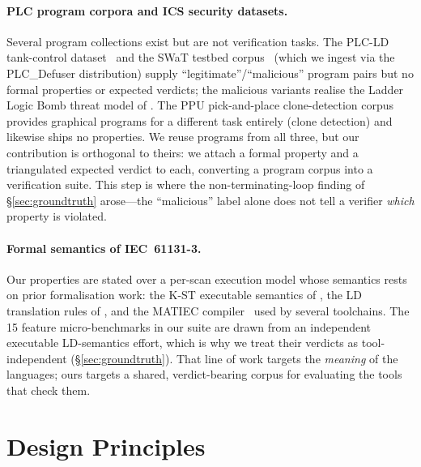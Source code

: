 \paragraph{PLC program corpora and ICS security datasets.}
Several program collections exist but are not verification tasks. The PLC-LD tank-control
dataset~\citep{iacobelli_detection_2024} and the SWaT testbed corpus~\citep{rinieri_plc_defuser_2024} (which we ingest via the
PLC\_Defuser distribution) supply ``legitimate''/``malicious'' program pairs but no formal
properties or expected verdicts; the malicious variants realise the Ladder Logic Bomb threat
model of \citet{govil_ladder_2017}. The PPU pick-and-place clone-detection corpus~\citep{rosiak_iec_2022}
provides graphical programs for a different task entirely (clone detection) and likewise ships no
properties. We reuse programs from all three, but our contribution is orthogonal to theirs: we
attach a formal property and a triangulated expected verdict to each, converting a program corpus
into a verification suite. This step is where the non-terminating-loop finding of
\S\ref{sec:groundtruth} arose---the ``malicious'' label alone does not tell a verifier
\emph{which} property is violated.

\paragraph{Formal semantics of IEC~61131-3.}
Our properties are stated over a per-scan execution model whose semantics rests on prior
formalisation work: the K-ST executable semantics of \citet{wang_k-st_2023}, the LD translation
rules of \citet{ebnenasir_formalizing_2023}, and the MATIEC compiler~\citep{de_sousa_matiec_2014} used by several
toolchains. The 15 feature micro-benchmarks in our suite are drawn from an independent executable
LD-semantics effort, which is why we treat their verdicts as tool-independent
(\S\ref{sec:groundtruth}). That line of work targets the \emph{meaning} of the languages; ours
targets a shared, verdict-bearing corpus for evaluating the tools that check them.

\section{Design Principles}
\label{sec:principles}

